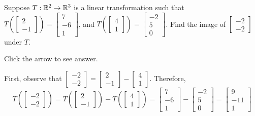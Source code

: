 \documentclass{ximera}
\begin{document}
\begin{problem}\label{prob:imOfVector1}
    Suppose $T:\mathbb{R}^2\rightarrow\mathbb{R}^3$ is a linear transformation such that $T\left(\begin{bmatrix}2\\-1\end{bmatrix}\right)=\begin{bmatrix}7\\-6\\1\end{bmatrix}$, and $T\left(\begin{bmatrix}4\\1\end{bmatrix}\right)=\begin{bmatrix}-2\\5\\0\end{bmatrix}$.  Find the image of $\begin{bmatrix}-2\\-2\end{bmatrix}$ under $T$.

    Click the arrow to see answer.

    \begin{expandable}
        First, observe that $\begin{bmatrix}-2\\-2\end{bmatrix}=\begin{bmatrix}2\\-1\end{bmatrix}-\begin{bmatrix}4\\1\end{bmatrix}$.  Therefore,
        $$T\left(\begin{bmatrix}-2\\-2\end{bmatrix}\right)=T\left(\begin{bmatrix}2\\-1\end{bmatrix}\right)-T\left(\begin{bmatrix}4\\1\end{bmatrix}\right)=\begin{bmatrix}7\\-6\\1\end{bmatrix}-\begin{bmatrix}-2\\5\\0\end{bmatrix}=\begin{bmatrix}9\\-11\\1\end{bmatrix}$$
    \end{expandable}
\end{problem}
\end{document}

